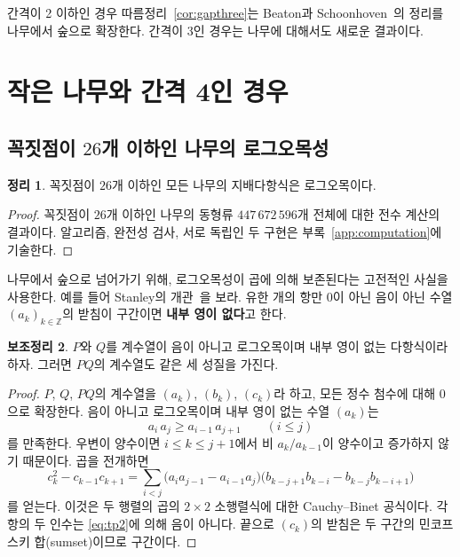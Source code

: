 \documentclass[11pt,a4paper]{article}
\theoremstyle{definition}
\newtheorem{theorem}{정리}[section]
\newtheorem{lemma}[theorem]{보조정리}
\newcommand{\MaxLC}{26}
\newcommand{\TotalTreesLC}{447\,672\,596}
\begin{document}
간격이 2 이하인 경우 따름정리~\ref{cor:gapthree}는 Beaton과
Schoonhoven~\cite[Corollary~17]{BS}의 정리를 나무에서 숲으로 확장한다. 간격이 3인
경우는 나무에 대해서도 새로운 결과이다.

\section{작은 나무와 간격 4인 경우}\label{sec:small}

\subsection{꼭짓점이 \texorpdfstring{$\MaxLC$}{26}개 이하인 나무의 로그오목성}

\begin{theorem}\label{thm:small}
꼭짓점이 $\MaxLC$개 이하인 모든 나무의 지배다항식은 로그오목이다.
\end{theorem}

\begin{proof}
꼭짓점이 $\MaxLC$개 이하인 나무의 동형류 $\TotalTreesLC$개 전체에 대한 전수 계산의
결과이다. 알고리즘, 완전성 검사, 서로 독립인 두 구현은 부록~\ref{app:computation}에
기술한다.
\end{proof}

나무에서 숲으로 넘어가기 위해, 로그오목성이 곱에 의해 보존된다는 고전적인 사실을
사용한다. 예를 들어 Stanley의 개관~\cite{Stanley}을 보라. 유한 개의 항만 0이 아닌 음이
아닌 수열 $(a_k)_{k\in\mathbb Z}$의 받침이 구간이면 \textbf{내부 영이 없다}고 한다.

\begin{lemma}\label{lem:product}
$P$와 $Q$를 계수열이 음이 아니고 로그오목이며 내부 영이 없는 다항식이라 하자. 그러면
$PQ$의 계수열도 같은 세 성질을 가진다.
\end{lemma}

\begin{proof}
$P$, $Q$, $PQ$의 계수열을 $(a_k)$, $(b_k)$, $(c_k)$라 하고, 모든 정수 첨수에 대해
0으로 확장한다. 음이 아니고 로그오목이며 내부 영이 없는 수열 $(a_k)$는
\begin{equation}\label{eq:tp2}
  a_i\,a_j\ge a_{i-1}\,a_{j+1}\qquad(i\le j)
\end{equation}
를 만족한다. 우변이 양수이면 $i\le k\le j+1$에서 비 $a_k/a_{k-1}$이 양수이고
증가하지 않기 때문이다. 곱을 전개하면
\[
  c_k^2-c_{k-1}c_{k+1}=\sum_{i<j}
  \bigl(a_i a_{j-1}-a_{i-1}a_j\bigr)\bigl(b_{k-j+1}b_{k-i}-b_{k-j}b_{k-i+1}\bigr)
\]
를 얻는다. 이것은 두 행렬의 곱의 $2\times2$ 소행렬식에 대한 Cauchy--Binet 공식이다.
각 항의 두 인수는 \eqref{eq:tp2}에 의해 음이 아니다. 끝으로 $(c_k)$의 받침은 두
구간의 민코프스키 합(sumset)이므로 구간이다.
\end{proof}
\end{document}
